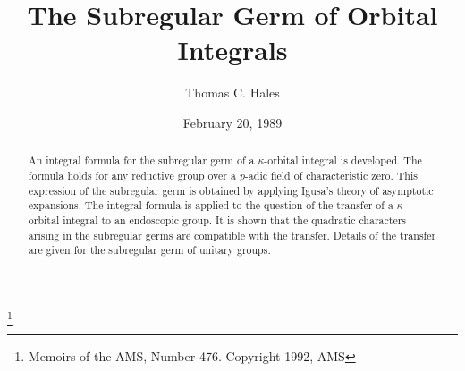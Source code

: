 \documentclass{memo-l}
\theoremstyle{definition}
\theoremstyle{remark}
\numberwithin{section}{chapter}
\numberwithin{equation}{chapter}
\begin{document}
\frontmatter

\title{The Subregular Germ of Orbital Integrals}
\author{Thomas C. Hales}
\address{University of Pittsburgh 15260}
\email{}
\thanks{Memoirs of the AMS, Number 476. Copyright 1992, AMS}
\date{February 20, 1989}


\keywords{}


\maketitle

\tableofcontents

\begin{abstract}
  An integral formula for the subregular germ of a $\kappa$-orbital
  integral is developed.  The formula holds for any reductive group
  over a $p$-adic field of characteristic zero.  This expression of
  the subregular germ is obtained by applying Igusa's theory of
  asymptotic expansions.  The integral formula is applied to the
  question of the transfer of a $\kappa$-orbital integral to an
  endoscopic group.  It is shown that the quadratic characters arising
  in the subregular germs are compatible with the transfer.  Details
  of the transfer are given for the subregular germ of unitary groups.
\end{abstract}

%

%








\newcommand\AAA{{\Bbb A}}                   \newcommand\BB{{\Bbb B\,}}
\newcommand\CC{{\Bbb C}}                    \newcommand\GG{{\Bbb G}}
\newcommand\PP{{\Bbb P}}                    \newcommand\RR{{\Bbb R}}
\newcommand\TT{{\Bbb T}}                    \newcommand\ZZ{{\Bbb Z}}
\newcommand\bWW{{\Bbb W}}                       \newcommand\bW{\bold{W}}
\end{document}
